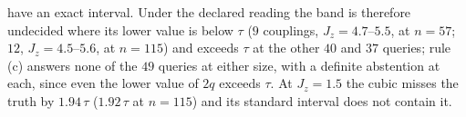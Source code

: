 \documentclass[aps,prx,onecolumn,10pt,nofootinbib,longbibliography,floatfix]{revtex4-2}
\theoremstyle{remark}
\newcommand{\Jz}{J_z}
\begin{document}
have an exact interval. Under the declared reading the band is therefore undecided where its lower value is below
$\tau$ ($9$ couplings, $\Jz=4.7$--$5.5$, at $n=57$; $12$, $\Jz=4.5$--$5.6$, at $n=115$) and exceeds $\tau$ at the %
other $40$ and $37$ queries; rule (c) answers none of the $49$ queries at either size, with a definite abstention %
at each, since even the lower value of $2q$ exceeds $\tau$. At $\Jz=1.5$ the cubic misses the truth by $1.94\,\tau$ %
($1.92\,\tau$ at $n=115$) and its standard interval does not contain it. %
\end{document}
